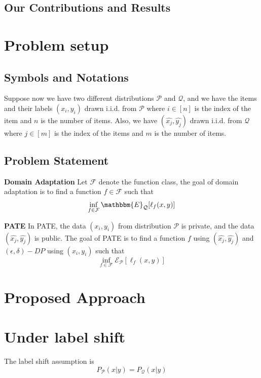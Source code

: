 \documentclass{article}
\def\cE{\mathcal{E}}
\theoremstyle{definition}
\begin{document}
\cite{Ji-ml13-differential}
\cite{wang-ecml18-differentially}
\cite{chen-aistat19-renyi}

\subsection{Our Contributions and Results}
% 

\section{Problem setup}
\subsection{Symbols and Notations}
Suppose now we have two different distributions $\mathcal{P}$ and $\mathcal{Q}$, and we have the items and their labels $(x_i,y_i)$ drawn i.i.d. from $\mathcal{P}$ where $i\in [n]$ is the index of the item and $n$ is the number of items. Also, we have $(\hat{x_j},\hat{y_j})$ drawn i.i.d. from $\mathcal{Q}$ where $j\in [m]$ is the index of the items and $m$ is the number of items.

\subsection{Problem Statement}
\textbf{Domain Adaptation}
Let $\mathcal{F}$ denote the function class, the goal of domain adaptation is to find a function $f\in \mathcal{F}$ such that
\begin{align*}
\inf_{f\in \mathcal{F}} \mathbbm{E}_{\mathcal{Q}}[ \ell_f (x,y)]
\end{align*}

\textbf{PATE}
In PATE, the data $(x_i, y_i)$ from distribution $\mathcal{P}$ is private, and the data $(\hat{x_j}, \hat{y_j})$ is public. The goal of PATE is to find a function $f$ using $(\hat{x_j}, \hat{y_j})$ and $(\epsilon,\delta)-DP$ using $(x_i, y_i)$ such that
\[
\inf_{f\in \mathcal{F}} \cE_{\mathcal{P}}[ \ell_f (x,y)]
\]

\section{Proposed Approach}


\section{Under label shift}
The label shift assumption is
\[
P_{\mathcal{P}}(x|y) = P_{\mathcal{Q}}(x|y)
\]
\end{document}
